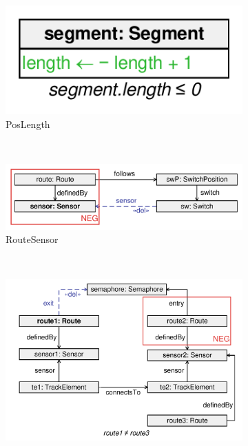 \begin{itemize}
  
\begin{figure}
        \centering
        \begin{subfigure}[b]{\textwidth}
        		\centering
                \includegraphics[scale=0.4]{figures/transformation-repair-poslength}
                \caption{\textsf{PosLength}}
                \label{fig:transformation-repair-poslength}
        \end{subfigure}
        ~
        \begin{subfigure}[b]{\textwidth}
                \centering
                \includegraphics[scale=0.4]{figures/transformation-repair-routesensor}
                \caption{\textsf{RouteSensor}}
                \label{fig:transformation-repair-routesensor}
        \end{subfigure}
        ~
        \begin{subfigure}[b]{\textwidth}
                \centering
                \includegraphics[scale=0.4]{figures/transformation-repair-semaphoreneighbor}

\end{subfigure}
\end{figure}
\end{itemize}
